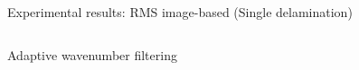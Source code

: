 \documentclass[10pt,aspectratio=169,dvipsnames]{beamer} %
\begin{document}
\begin{frame}{Experimental results: RMS image-based (Single delamination)}
\begin{columns}[T]
\begin{column}[t]{0.5\textwidth}
\begin{block}{Adaptive wavenumber filtering}
\begin{figure}[ht!]
					\captionsetup{justification=centering}
					\quad

\end{figure}
\end{block}
\end{column}
\end{columns}
\end{frame}
\end{document}
